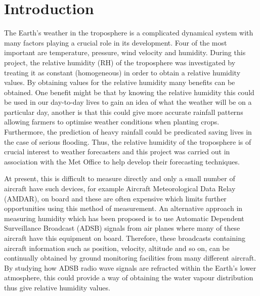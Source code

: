 \documentclass{article}
\begin{document}
\vspace{5mm} %

\newpage

\tableofcontents


\setcounter{page}{1} %

\newpage


\section{Introduction}
\label{sec:introduction}

The Earth's weather in the troposphere is a complicated dynamical system with many factors playing a crucial role in its development. Four of the most important are temperature, pressure, wind velocity and humidity. During this project, the relative humidity (RH) of the troposphere was investigated by treating it as constant (homogeneous) in order to obtain a relative humidity values. By obtaining values for the relative humidity many benefits can be obtained. One benefit might be that by knowing the relative humidity this could be used in our day-to-day lives to gain an idea of what the weather will be on a particular day, another is that this could give more accurate rainfall patterns allowing farmers to optimise weather conditions when planting crops. Furthermore, the prediction of heavy rainfall could be predicated {\textemdash} saving lives in the case of serious flooding. Thus, the relative humidity of the troposphere is of crucial interest to weather forecasters and this project was carried out in association with the Met Office to help develop their forecasting techniques.

\vspace{2mm}
\noindent
At present, this is difficult to measure directly and only a small number of aircraft have such devices, for example Aircraft Meteorological Data Relay (AMDAR), on board \cite{Paper01} and these are often expensive which limits further opportunities using this method of measurement. An alternative approach in measuring humidity which has been proposed \cite{Paper01} is to use Automatic Dependent Surveillance Broadcast (ADSB) signals from air planes where many of these aircraft have this equipment on board. Therefore, these broadcasts containing aircraft information such as position, velocity, altitude and so on, can be continually obtained by ground monitoring facilities from many different aircraft. By studying how ADSB radio wave signals are refracted within the Earth's lower atmosphere, this could provide a way of obtaining the water vapour distribution thus give relative humidity values.
\end{document}
